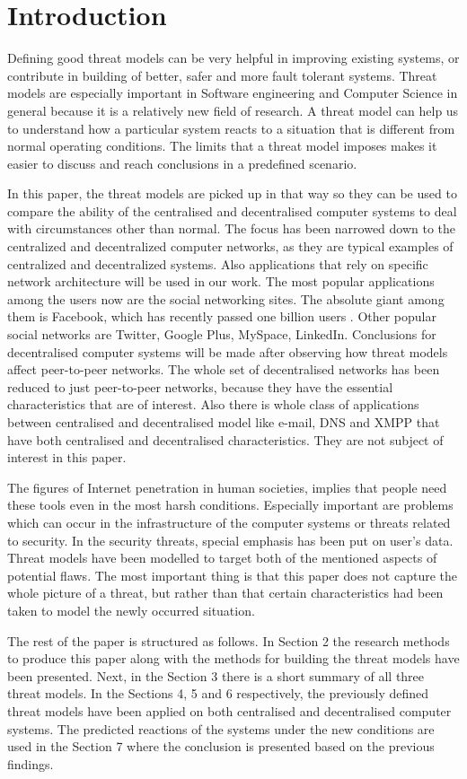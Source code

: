 \newpage
\section{Introduction}
Defining good threat models can be very helpful in improving existing systems, or contribute in building of better, safer and more fault tolerant systems.
Threat models are especially important in Software engineering and Computer Science in general because it is a relatively new field of research.
A threat model can help us to understand how a particular system reacts to a situation that is different from normal operating conditions.
The limits that a threat model imposes makes it easier to discuss and reach conclusions in a predefined scenario.

In this paper, the threat models are picked up in that way so they can be used to compare the ability of the centralised and decentralised computer systems to deal with circumstances other than normal.
The focus has been narrowed down to the centralized and decentralized computer networks, as they are typical examples of centralized and decentralized systems. Also applications that rely on specific network architecture will be used in our work.
The most popular applications among the users now are the social networking sites. The absolute giant among them is Facebook, which has recently passed one billion users \cite{web:facebookpassesbillion}. Other popular social networks are Twitter, Google Plus, MySpace, LinkedIn.
Conclusions for decentralised computer systems will be made after observing how threat models affect peer-to-peer networks.
The whole set of decentralised networks has been reduced to just peer-to-peer networks, because they have the essential characteristics that are of interest.
Also there is whole class of applications between centralised and decentralised model like e-mail, DNS and XMPP that have both centralised and decentralised characteristics.
They are not subject of interest in this paper.

The figures of Internet penetration \cite{web:internetworldstats} in human societies, implies that people need these tools even in the most harsh conditions.
Especially important are problems which can occur in the infrastructure of the computer systems or threats related to security.
In the security threats, special emphasis has been put on user's data.
Threat models have been modelled to target both of the mentioned aspects of potential flaws.
The most important thing is that this paper does not capture the whole picture of a threat, but rather than that certain characteristics had been taken to model the newly occurred situation.

The rest of the paper is structured as follows.
In Section 2 the research methods to produce this paper along with the methods for building the threat models have been presented.
Next, in the Section 3 there is a short summary of all three threat models.
In the Sections 4, 5 and 6 respectively, the previously defined threat models have been applied on both centralised and decentralised computer systems.
The predicted reactions of the systems under the new conditions are used in the Section 7 where the conclusion is presented based on the previous findings.
